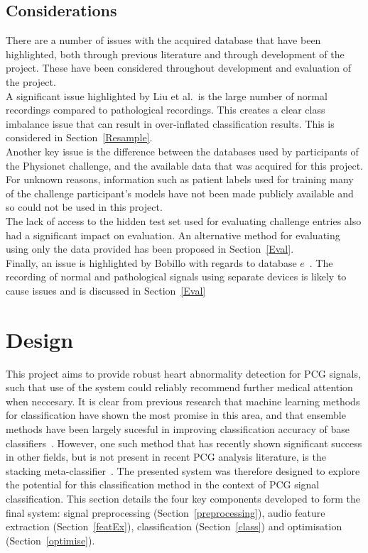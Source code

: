 \documentclass[titlepage, 12pt]{scrartcl} \usepackage{enumitem}
\begin{document}
\subsection{Considerations}\label{DBCons}
There are a number of issues with the acquired database that have been
highlighted, both through previous literature and through development of the
project. These have been considered throughout development and evaluation of
the project.\\
A significant issue highlighted by Liu et al.\ is the large number of normal
recordings compared to pathological recordings. This creates a clear class
imbalance issue that can result in over-inflated classification
results. This is considered in
Section~\ref{Resample}.\\
Another key issue is the difference between the databases used by participants of the
Physionet challenge, and the available data that was acquired for this project.
For unknown reasons, information such as patient labels used for training many
of the challenge participant's models have not been made publicly available and
so could not be used in this project.\\
The lack of access to the hidden test set used for evaluating challenge entries
also had a significant impact on evaluation. An alternative method for
evaluating using only the data provided has been proposed in
Section~\ref{Eval}.\\
Finally, an issue is highlighted by Bobillo with regards to database
$e$~\parencite{Bobillo2016}. The recording of normal and pathological signals using
separate devices is likely to cause issues and is discussed in
Section~\ref{Eval}

\section{Design}
This project aims to provide robust heart abnormality detection for PCG
signals, such that use of the system could reliably recommend further medical
attention when neccesary. It is clear from previous research that machine
learning methods for classification have shown the most promise in this area,
and that ensemble methods have been largely sucesful in improving
classification accuracy of base classifiers~\parencite{Homsi2017, Potes2016}.
However, one such method that has recently shown significant success in other
fields, but is not present in recent PCG analysis literature, is the stacking
meta-classifier~\parencite[p.498]{Tobergte2013a}. The presented system was
therefore designed to explore the potential for this classification method in
the context of PCG signal classification. This section details the four key
components developed to form the final system: signal preprocessing
(Section~\ref{preprocessing}), audio feature extraction (Section~\ref{featEx}),
classification (Section~\ref{class}) and optimisation (Section~\ref{optimise}).
\end{document}
